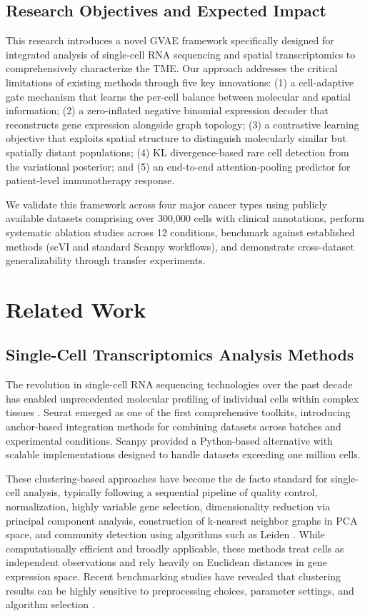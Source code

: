 \documentclass{article}
\begin{document}
\subsection{Research Objectives and Expected Impact}

This research introduces a novel GVAE framework specifically designed for integrated analysis of single-cell RNA sequencing and spatial transcriptomics to comprehensively characterize the TME. Our approach addresses the critical limitations of existing methods through five key innovations: (1) a cell-adaptive gate mechanism that learns the per-cell balance between molecular and spatial information; (2) a zero-inflated negative binomial expression decoder that reconstructs gene expression alongside graph topology; (3) a contrastive learning objective that exploits spatial structure to distinguish molecularly similar but spatially distant populations; (4) KL divergence-based rare cell detection from the variational posterior; and (5) an end-to-end attention-pooling predictor for patient-level immunotherapy response.

We validate this framework across four major cancer types using publicly available datasets comprising over 300,000 cells with clinical annotations, perform systematic ablation studies across 12 conditions, benchmark against established methods (scVI and standard Scanpy workflows), and demonstrate cross-dataset generalizability through transfer experiments.

\section{Related Work}

\subsection{Single-Cell Transcriptomics Analysis Methods}

The revolution in single-cell RNA sequencing technologies over the past decade has enabled unprecedented molecular profiling of individual cells within complex tissues \citep{tanay2017scaling}. Seurat \citep{satija2015spatial} emerged as one of the first comprehensive toolkits, introducing anchor-based integration methods for combining datasets across batches and experimental conditions. Scanpy \citep{wolf2018scanpy} provided a Python-based alternative with scalable implementations designed to handle datasets exceeding one million cells.

These clustering-based approaches have become the de facto standard for single-cell analysis, typically following a sequential pipeline of quality control, normalization, highly variable gene selection, dimensionality reduction via principal component analysis, construction of k-nearest neighbor graphs in PCA space, and community detection using algorithms such as Leiden \citep{traag2019louvain}. While computationally efficient and broadly applicable, these methods treat cells as independent observations and rely heavily on Euclidean distances in gene expression space. Recent benchmarking studies have revealed that clustering results can be highly sensitive to preprocessing choices, parameter settings, and algorithm selection \citep{luecken2019current}.
\end{document}
